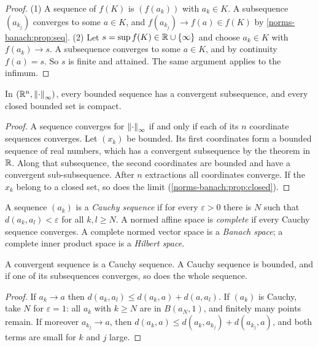 \begin{notechapter}
\begin{proof}
(1) A sequence of $f(K)$ is $(f(a_k))$ with $a_k\in K$. A subsequence
$(a_{k_j})$ converges to some $a\in K$, and $f(a_{k_j})\to f(a)\in f(K)$
by \cref{norms-banach:prop:seq}. (2) Let $s = \sup f(K)\in\mathbb{R}\cup\{\infty\}$
and choose $a_k\in K$ with $f(a_k)\to s$. A subsequence converges to some
$a\in K$, and by continuity $f(a) = s$. So $s$ is finite and attained. The
same argument applies to the infimum.
\end{proof}

\begin{theorem}\label{norms-banach:thm:bw}
In $(\mathbb{R}^n, \left\|\cdot\right\|_\infty)$, every bounded sequence has a convergent
subsequence, and every closed bounded set is compact.
\end{theorem}

\begin{proof}
A sequence converges for $\left\|\cdot\right\|_\infty$ if and only if each of its
$n$ coordinate sequences converges. Let $(x_k)$ be bounded. Its first
coordinates form a bounded sequence of real numbers, which has a
convergent subsequence by the theorem in $\mathbb{R}$. Along that subsequence, the
second coordinates are bounded and have a convergent sub-subsequence. After
$n$ extractions all coordinates converge. If the $x_k$ belong to a closed
set, so does the limit (\cref{norms-banach:prop:closed}).
\end{proof}

\begin{definition}
A sequence $(a_k)$ is a \emph{Cauchy sequence} if for every
$\varepsilon > 0$ there is $N$ such that $d(a_k, a_l) < \varepsilon$ for
all $k, l\geq N$. A normed affine space is \emph{complete} if every Cauchy
sequence converges. A complete normed vector space is a \emph{Banach
space}; a complete inner product space is a \emph{Hilbert space}.
\end{definition}

\begin{proposition}\label{norms-banach:prop:cauchy}
A convergent sequence is a Cauchy sequence. A Cauchy sequence is bounded,
and if one of its subsequences converges, so does the whole sequence.
\end{proposition}

\begin{proof}
If $a_k\to a$ then $d(a_k, a_l)\leq d(a_k, a) + d(a, a_l)$. If $(a_k)$ is
Cauchy, take $N$ for $\varepsilon = 1$: all $a_k$ with $k\geq N$ are in
$B(a_N, 1)$, and finitely many points remain. If moreover $a_{k_j}\to a$,
then $d(a_k, a)\leq d(a_k, a_{k_j}) + d(a_{k_j}, a)$, and both terms are
small for $k$ and $j$ large.
\end{proof}


\end{notechapter}
